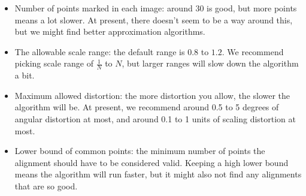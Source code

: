 \documentclass{csafedoc}
\begin{document}
\begin{itemize}
	\item Number of points marked in each image: around 30 is good, but more points means
	      a lot slower. At present, there doesn't seem to be a way around this, but we might find
	      better approximation algorithms.
	\item The allowable scale range: the default range is $0.8$ to $1.2$. We recommend
	      picking scale range of $\frac{1}{N}$ to $N$, but larger ranges will slow down the
	      algorithm a bit.
	\item Maximum allowed distortion: the more distortion you allow, the slower the
	      algorithm will be. At present, we recommend around 0.5 to 5 degrees of angular
	      distortion at most, and around 0.1 to 1 units of scaling distortion at most.
	\item Lower bound of common points: the minimum number of points the alignment should
	      have to be considered valid. Keeping a high lower bound means the algorithm will
	      run faster, but it might also not find any alignments that are so good.
\end{itemize}

\newpage
\nocite{*}

\end{document}
